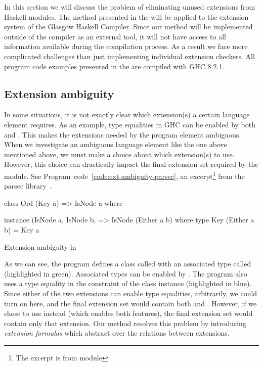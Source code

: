 \documentclass[main.tex]{subfiles}
\begin{document}
	
	In this section we will discuss the problem of eliminating unused extensions from Haskell modules. The method presented in the \paper{} will be applied to the extension system of the Glasgow Haskell Compiler. Since our method will be implemented outside of the compiler as an external tool, it will not have access to all information available during the compilation process. As a result we face more complicated challenges than just implementing individual extension checkers. All program code examples presented in the \paper{} are compiled with GHC 8.2.1.
	
	\subsection{Extension ambiguity}
	
	In some situations, it is not exactly clear which extension(s) a certain language element requires. As an example, type equalities in GHC can be enabled by both  and . This makes the extensions needed by the program element ambiguous. When we investigate an ambiguous language element like the one above mentioned above, we must make a choice about which extension(s) to use. However, this choice can drastically impact the final extension set required by the module. See Program~code~\ref{code:ext-ambiguity-parsec}, an excerpt\footnote{The excerpt is from module } from the parsec library~\cite{parsec}.
	
	\begin{codeFloat}
		\begin{haskell}
			class Ord (Key a) => IsNode a 
			  where %
			
			instance (IsNode a, IsNode b, %
			          => IsNode (Either a b) where
			type Key (Either a b) = Key a
		\end{haskell}
		\caption{Extension ambiguity in }
		\label{code:ext-ambiguity-parsec}
	\end{codeFloat}
	
	As we can see, the program defines a class called  with an associated type called  (highlighted in green). Associated types can be enabled by . The program	also uses a type equality in the constraint of the  class instance (highlighted in blue). Since either of the two extensions can enable type equalities, arbitrarily, we could turn on  here, and the final extension set would contain both  and . However, if we chose to use  instead (which enables both features), the final extension set would contain only that extension. Our method resolves this problem by introducing \emph{extension formulas} which abstract over the relations between extensions.
	
\end{document}
